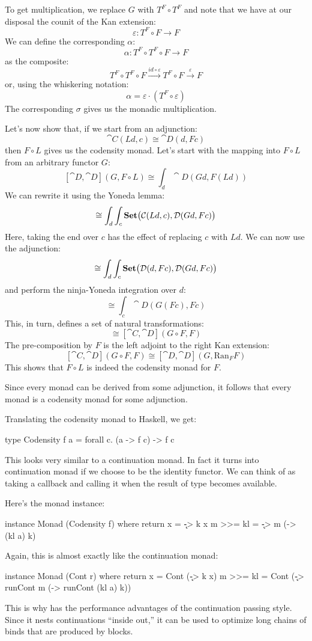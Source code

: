 \documentclass[DaoFP]{subfiles}
\begin{document}
To get multiplication, we replace $G$ with $T^F \circ T^F$ and note that we have at our disposal the counit of the Kan extension:
\[ \varepsilon \colon  T^F \circ F \to F \]
We can define the corresponding $\alpha$:
\[ \alpha \colon T^F \circ T^F \circ F \to F \]
as the composite:
\[ T^F \circ T^F \circ F \xrightarrow{id \circ \varepsilon} T^F \circ F \xrightarrow{\varepsilon} F\]
or, using the whiskering notation:
\[ \alpha = \varepsilon \cdot (T^F \circ \varepsilon) \]
The corresponding $\sigma$ gives us the monadic multiplication.

Let's now show that, if we start from an adjunction:
\[ \cat C(L d, c) \cong \cat D (d, F c) \]
then $F \circ L$ gives us the codensity monad. Let's start with the mapping into $F \circ L$ from an arbitrary functor $G$:
\[ [\cat D, \cat D](G, F \circ L) \cong  \int_d \cat D (G d, F (L d)) \]
We can rewrite it using the Yoneda lemma:
\[ \cong \int_d \int_c \mathbf{Set}\big(\mathcal{C}(L d, c), \mathcal{D} (G d, F c)\big) \]
Here, taking the end over $c$ has the effect of replacing $c$ with $L d$. We can now use the adjunction:
\[ \cong \int_d \int_c \mathbf{Set}\big(\mathcal{D}(d, F c), \mathcal{D} (G d, F c)\big) \]
and perform the ninja-Yoneda integration over $d$:
\[ \cong \int_c \cat D (G (F c), F c) \]
This, in turn, defines a set of natural transformations:
\[ \cong [\cat C, \cat D](G \circ F, F) \]
The pre-composition by $F$ is the left adjoint to the right Kan extension:
\[ [\cat C, \cat D](G \circ F, F) \cong  [\cat D, \cat D] (G, \text{Ran}_F F)\]
This shows that $F \circ L$ is indeed the codensity monad for $F$.

Since every monad can be derived from some adjunction, it follows that every monad is a codensity monad for some adjunction.

Translating the codensity monad to Haskell, we get:
 \begin{haskell}
type Codensity f a = forall c. (a -> f c) -> f c
 \end{haskell}
This looks very similar to a continuation monad. In fact it turns into continuation monad if we choose  to be the identity functor. We can think of  as taking a callback  and calling it when the result of type  becomes available. 

Here's the monad instance:
 \begin{haskell}
instance Monad (Codensity f) where
  return x = \k -> k x
  m >>= kl = \k -> m (\a -> (kl a) k)
 \end{haskell}
 Again, this is almost exactly like the continuation monad:
 \begin{haskell}
instance Monad (Cont r) where
  return x = Cont (\k -> k x)
  m >>= kl = Cont (\k -> runCont m (\a -> runCont (kl a) k))
\end{haskell}
This is why  has the performance advantages of the continuation passing style. Since it nests continuations ``inside out,'' it can be used to optimize long chains of binds that are produced by  blocks. 
\end{document}
